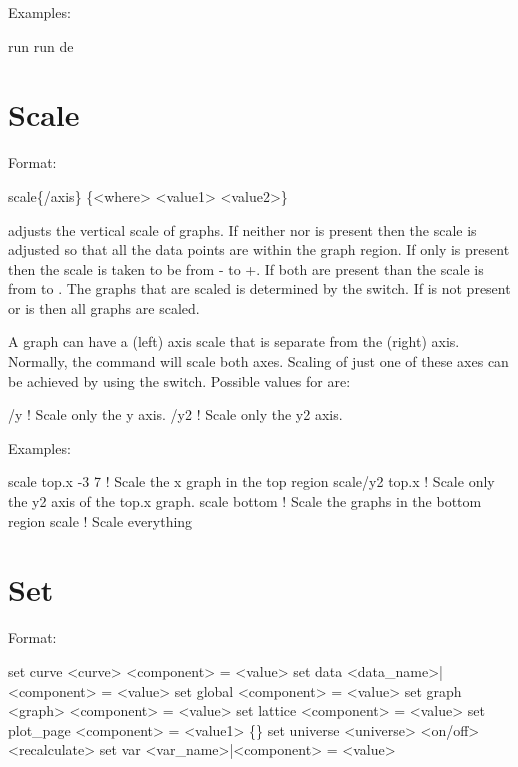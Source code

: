 {Examples:
\begin{example}
  run 
  run de
\end{example}

\section{Scale}
\label{s:scale}

Format:
\begin{example}
  scale\{/axis\} \{<where> <value1> <value2>\}
\end{example}

\vskip 0.2in 
 adjusts the vertical scale of graphs. If neither
 nor  is present then the scale is adjusted
so that all the data points are within the graph region.  If only
 is present then the scale is taken to be from
- to +. If both are present than the scale
is from  to .  The graphs that are scaled is
determined by the  switch. If  is not present
or  is  then all graphs are scaled.

A graph can have a  (left) axis scale that is separate from the  (right) 
axis. Normally, the  command will scale both axes.  Scaling of just one of these
axes can be achieved by using the  switch. Possible values for  are:
\begin{example}
  /y                 ! Scale only the y axis.
  /y2                ! Scale only the y2 axis.
\end{example}

Examples:
\begin{example}
  scale top.x -3  7  ! Scale the x graph in the top region
  scale/y2 top.x     ! Scale only the y2 axis of the top.x graph.
  scale bottom       ! Scale the graphs in the bottom region
  scale              ! Scale everything
\end{example}


\section{Set}
\label{s:set}

Format:
\begin{example}
  set curve <curve> <component> = <value>
  set data <data_name>|<component> = <value>
  set global <component> = <value>
  set graph <graph> <component> = <value>
  set lattice <component> = <value>
  set plot_page <component> = <value1> \{<value2>\}
  set universe <universe> <on/off> <recalculate>
  set var <var_name>|<component> = <value>
\end{example}

}
